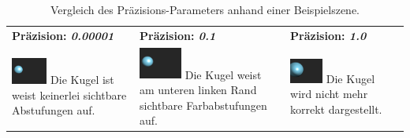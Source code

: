 \begin{table}[H]
    \centering
    \caption{Vergleich des Präzisions-Parameters anhand einer Beispielszene.}\label{table:sphere_tracing_precision}
    \begin{tabular}{p{}p{}p{}}
        \toprule
            \textbf{Präzision: \textit{0.00001}} &
            \textbf{Präzision: \textit{0.1}}     &
            \textbf{Präzision: \textit{1.0}}     \\
        \cmidrule(r){1-1}\cmidrule(lr){2-2}\cmidrule(l){3-3}
            \includegraphics[width=0.3\textwidth]{img/sphere_tracing_precision_full.pdf} \newline
            Die Kugel ist weist keinerlei sichtbare Abstufungen auf. &
            \includegraphics[width=0.3\textwidth]{img/sphere_tracing_precision_min.pdf} \newline
            Die Kugel weist am unteren linken Rand sichtbare Farbabstufungen auf. &
            \includegraphics[width=0.3\textwidth]{img/sphere_tracing_precision_pos.pdf} \newline
            Die Kugel wird nicht mehr korrekt dargestellt. \\
        \bottomrule
    \end{tabular}
\end{table}

